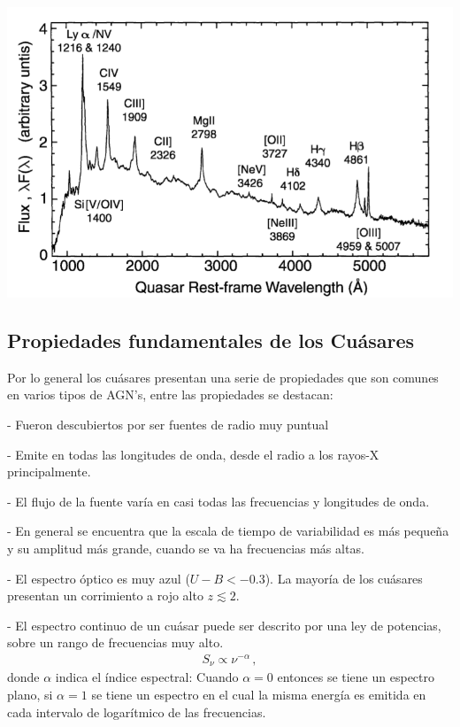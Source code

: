 \begin{center}
\includegraphics[scale=.3]{./figures/3_AGNs/Espectro_tipico_AGN.png}
\label{fig:Espectro_QSOs}
\end{center}
	\subsection{Propiedades fundamentales de los Cuásares}
	\label{subsec:Fundamental_properties_quasars}

Por lo general los cuásares presentan una serie de propiedades que son comunes en varios tipos de AGN's, entre las propiedades se destacan:


- Fueron descubiertos por ser fuentes de radio muy puntual 

- Emite en todas las longitudes de onda, desde el radio a los rayos-X principalmente.

- El flujo de la fuente varía en casi todas las frecuencias y longitudes de onda.

- En general se encuentra que la escala de tiempo de variabilidad es más pequeña y su amplitud más grande, cuando se va ha frecuencias más altas.

- El espectro óptico es muy azul ($U-B < -0.3$). La mayoría de los cuásares presentan un corrimiento a rojo alto  $z \lesssim 2$.

- El espectro continuo de un cuásar puede ser descrito por una ley de potencias, sobre un rango de frecuencias muy alto.
%
\begin{align}
S_{\nu} \propto \nu^{-\alpha} \,,
\end{align}
%
 donde $\alpha$ indica el índice espectral: Cuando $\alpha=0$ entonces se tiene un espectro plano, si $\alpha=1$ se tiene un espectro en el cual la misma energía es emitida en cada intervalo de logarítmico de las frecuencias. 


